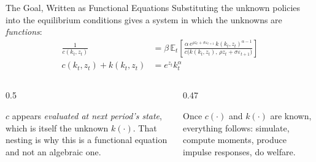 \begin{frame}{The Goal, Written as Functional Equations}
\small
Substituting the unknown policies into the equilibrium conditions gives a system in which the unknowns are \emph{functions}:
\begin{align*}
\frac{1}{c(k_{t},z_{t})} &=\beta\,\mathbb{E}_{t}\!\left[\frac{\alpha\,e^{\rho z_{t}+\sigma\varepsilon_{t+1}}\,k(k_{t},z_{t})^{\alpha-1}}
{c\big(k(k_{t},z_{t}),\,\rho z_{t}+\sigma\varepsilon_{t+1}\big)}\right]\\[1mm]
c(k_{t},z_{t})+k(k_{t},z_{t}) &= e^{z_{t}}k_{t}^{\alpha}
\end{align*}
\medskip
\begin{columns}[T]
\begin{column}{0.5\textwidth}
\begin{conceptbox}[title=\textbf{Read the composition}]\footnotesize
$c$ appears \emph{evaluated at next period's state}, which is itself the unknown $k(\cdot)$. That nesting is why this is a functional equation and not an algebraic one.
\end{conceptbox}
\end{column}
\begin{column}{0.47\textwidth}
\begin{examplebox}\footnotesize
Once $c(\cdot)$ and $k(\cdot)$ are known, everything follows: simulate, compute moments, produce impulse responses, do welfare.
\end{examplebox}
\end{column}
\end{columns}
\vspace{1mm}
\end{frame}

